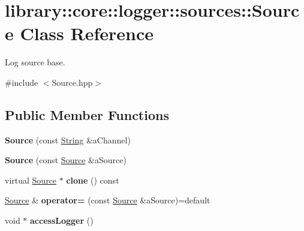 \hypertarget{classlibrary_1_1core_1_1logger_1_1sources_1_1_source}{}\section{library\+:\+:core\+:\+:logger\+:\+:sources\+:\+:Source Class Reference}
\label{classlibrary_1_1core_1_1logger_1_1sources_1_1_source}


Log source base.  




{\ttfamily \#include $<$Source.\+hpp$>$}

\subsection*{Public Member Functions}
\begin{DoxyCompactItemize}
\item 
\mbox{\label{classlibrary_1_1core_1_1logger_1_1sources_1_1_source_a3491482f16ae952683c7c6fbc3d3a1be}} 
{\bfseries Source} (const \hyperlink{classlibrary_1_1core_1_1types_1_1_string}{String} \&a\+Channel)
\item 
\mbox{\label{classlibrary_1_1core_1_1logger_1_1sources_1_1_source_ae694934c9cc6666e753c777e3fe4982f}} 
{\bfseries Source} (const \hyperlink{classlibrary_1_1core_1_1logger_1_1sources_1_1_source}{Source} \&a\+Source)
\item 
\mbox{\label{classlibrary_1_1core_1_1logger_1_1sources_1_1_source_a26b4ca6b752737375ab35438c5906775}} 
virtual \hyperlink{classlibrary_1_1core_1_1logger_1_1sources_1_1_source}{Source} $\ast$ {\bfseries clone} () const
\item 
\mbox{\label{classlibrary_1_1core_1_1logger_1_1sources_1_1_source_a5d08e7063ee3b5d1c2b894d9747cc35f}} 
\hyperlink{classlibrary_1_1core_1_1logger_1_1sources_1_1_source}{Source} \& {\bfseries operator=} (const \hyperlink{classlibrary_1_1core_1_1logger_1_1sources_1_1_source}{Source} \&a\+Source)=default
\item 
\mbox{\label{classlibrary_1_1core_1_1logger_1_1sources_1_1_source_ac28b1b4043350085a68336ccd8bcb134}} 
void $\ast$ {\bfseries access\+Logger} ()
\end{DoxyCompactItemize}
